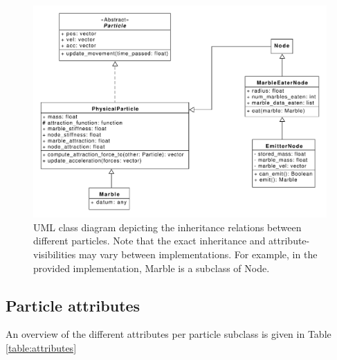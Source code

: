 \begin{figure}[h]
    \centering
    \includegraphics[scale=0.5]{figures/particles_class_diagram.pdf}
    \caption{UML class diagram depicting the inheritance relations between different particles. Note that the exact inheritance and attribute-visibilities may vary between implementations. For example, in the provided implementation, Marble is a subclass of Node.}
    \label{fig:particles_class_diagram}
\end{figure}

\subsection{Particle attributes}
An overview of the different attributes per particle subclass is given in Table \ref{table:attributes} 

